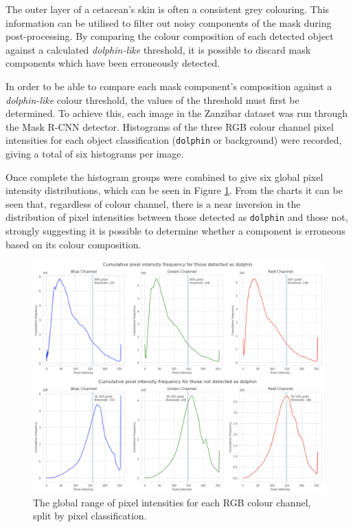 The outer layer of a cetacean's skin is often a consistent grey colouring. This information can be utilised to filter out noisy components of the mask during post-processing. By comparing the colour composition of each detected object against a calculated \textit{dolphin-like} threshold, it is possible to discard mask components which have been erroneously detected.

In order to be able to compare each mask component's composition against a \textit{dolphin-like} colour threshold, the values of the threshold must first be determined. To achieve this, each image in the Zanzibar dataset was run through the Mask R-CNN detector. Histograms of the three RGB colour channel pixel intensities for each object classification (\texttt{dolphin} or background) were recorded, giving a total of six histograms per image. 

Once complete the histogram groups were combined to give six global pixel intensity distributions, which can be seen in Figure \ref{fig:global-histogram}. From the charts it can be seen that, regardless of colour channel, there is a near inversion in the distribution of pixel intensities between those detected as \texttt{dolphin} and those not, strongly suggesting it is possible to determine whether a component is erroneous based on its colour composition.

\begin{figure}
	\begin{center}
		\includegraphics[scale=0.7]{Chapter3/figs/histogram.png}
	\end{center}
	\caption{The global range of pixel intensities for each RGB colour channel, split by pixel classification.}\label{fig:global-histogram}
\end{figure}

